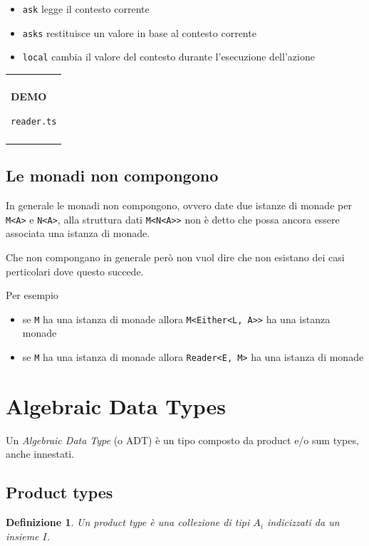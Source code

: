 \documentclass[12pt]{article}
\newtheorem{definition}{Definizione}
\newenvironment{boxed}
    {\begin{center}
    \begin{tabular}{|p{0.9\textwidth}|}
    \hline\\
    }
    {
    \\\\\hline
    \end{tabular}
    \end{center}
    }
\begin{document}
\begin{itemize}
  \item \texttt{ask} legge il contesto corrente
  \item \texttt{asks} restituisce un valore in base al contesto corrente
  \item \texttt{local} cambia il valore del contesto durante l'esecuzione dell'azione
\end{itemize}

\begin{boxed}
\begin{center}
\textbf{DEMO}

\texttt{reader.ts}
\end{center}
\end{boxed}


\subsection{Le monadi non compongono}

In generale le monadi non compongono, ovvero date due istanze di monade per \texttt{M<A>} e \texttt{N<A>},
alla struttura dati \texttt{M<N<A>>} non è detto che possa ancora essere associata una istanza di monade.

Che non compongano in generale però non vuol dire che non esistano dei casi perticolari dove questo succede.

Per esempio

\begin{itemize}
  \item se \texttt{M} ha una istanza di monade allora \texttt{M<Either<L, A>>} ha una istanza monade
  \item se \texttt{M} ha una istanza di monade allora \texttt{Reader<E, M>} ha una istanza di monade
\end{itemize}

\newpage

\section{Algebraic Data Types}

Un \emph{Algebraic Data Type} (o ADT) è un tipo composto da product e/o sum types, anche innestati.

\subsection{Product types}

\begin{definition}
Un product type è una collezione di tipi $A_i$ indicizzati da un insieme $I$.
\end{definition}
\end{document}
